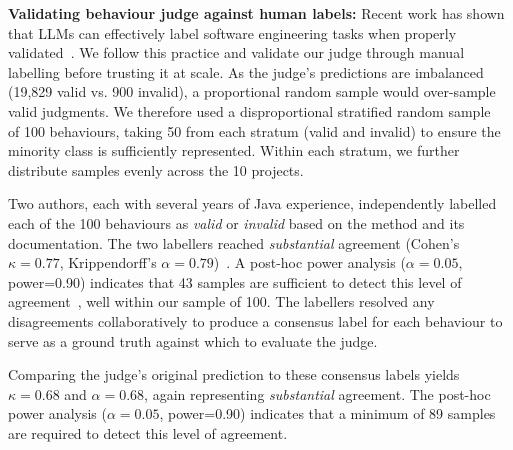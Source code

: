 \smallskip
\noindent\textbf{Validating behaviour judge against human labels:}
%
Recent work has shown that LLMs can effectively label software engineering tasks when properly validated~\cite{ahmed2025can, 10.1145/3797276, zhou2025llm}. We follow this practice and validate our judge through manual labelling before trusting it at scale.
As the judge’s predictions are imbalanced (19,829 valid vs. 900 invalid), a proportional random sample would 
over-sample valid judgments. %
We therefore used a disproportional stratified random sample~\cite{rs11020185} of 100 behaviours, taking 50 from each stratum (valid and invalid) to ensure the minority class is sufficiently represented. %
Within each stratum, we further distribute samples evenly across the 10 projects. %


Two authors, each with several years of Java experience, independently labelled each of the 100 behaviours as \textit{valid} or \textit{invalid} based on the method and its documentation. 
The two labellers reached \emph{substantial} agreement (Cohen's $\kappa=0.77$, Krippendorff's $\alpha=0.79$)~\cite{mchugh2012interrater}.
A post-hoc power analysis ($\alpha=0.05$, power=0.90) indicates that 43 samples are sufficient to detect this level of agreement~\cite{doi:10.1177/02537176261422290}, well within our sample of 100. 
The labellers resolved any disagreements collaboratively to produce a consensus label for each behaviour to serve as a ground truth against which to evaluate the judge.

Comparing the judge's original prediction to these consensus labels yields $\kappa = 0.68$ and $\alpha = 0.68$, again representing \emph{substantial} agreement.
The post-hoc power analysis ($\alpha=0.05$, power=0.90) indicates that a minimum of 89 samples are required to detect this level of agreement.

